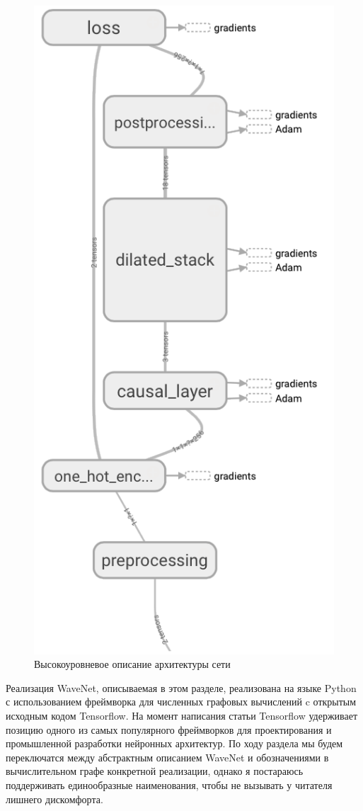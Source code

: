 \documentclass[../diploma.tex]{subfiles}
\begin{document}
\begin{figure}[!htbp]
  \centering
  \includegraphics[scale=1.1]{img/network}
  \caption{Высокоуровневое описание архитектуры сети}
  \label{fig:arch_high}
\end{figure}

Реализация WaveNet, описываемая в этом разделе, реализована на языке Python с использованием фреймворка для численных графовых вычислений c открытым исходным кодом Tensorflow. На момент написания статьи Tensorflow удерживает позицию одного из самых популярного фреймворков для проектирования и промышленной разработки нейронных архитектур.
По ходу раздела мы будем переключатся между абстрактным описанием WaveNet и обозначениями в вычислительном графе конкретной реализации, однако я постараюсь поддерживать единообразные наименования, чтобы не вызывать у читателя лишнего дискомфорта.
\end{document}
